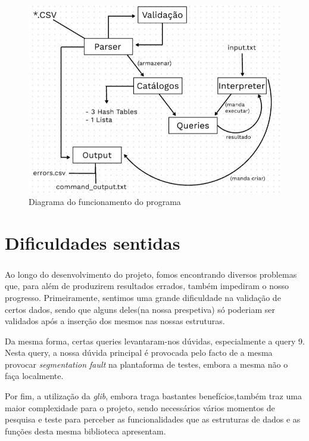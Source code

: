 \documentclass[12pt,a4paper]{report}
\begin{document}
    \begin{figure}[h]
    \includegraphics[scale = 0.7]{diagrama2.jpeg}
    \centering
    \caption{Diagrama do funcionamento do programa}
    \end{figure} 
    
\newpage

    \chapter{Dificuldades sentidas}

    \paragraph{} Ao longo do desenvolvimento do projeto, fomos encontrando diversos problemas que, para além de produzirem resultados errados, também impediram o nosso progresso.
    Primeiramente, sentimos uma grande dificuldade na validação de certos dados, sendo que alguns deles(na nossa prespetiva) só poderiam ser validados após a inserção dos mesmos nas nossas estruturas.
    \par Da mesma forma, certas queries levantaram-nos dúvidas, especialmente a query 9. Nesta query, a nossa dúvida principal é provocada pelo facto de a mesma provocar \textit{segmentation fault} na plantaforma de testes, embora a mesma não o faça localmente.
    \par Por fim, a utilização da \textit{glib}, embora traga bastantes benefícios,também traz uma maior complexidade para o projeto, sendo necessários vários momentos de pesquisa e teste para perceber as funcionalidades que as estruturas de dados e as funções desta mesma biblioteca apresentam.
    
\end{document}
